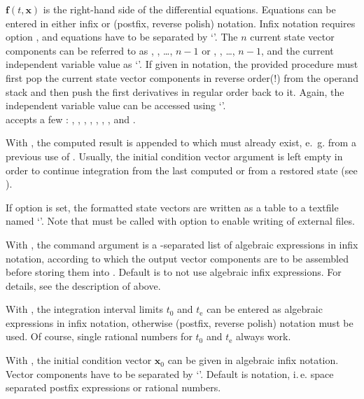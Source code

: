 \documentclass[11pt,english,BCOR10mm,DIV12,bibliography=totoc,parskip=false,smallheadings
    headexclude,footexclude,oneside,dvips]{pst-doc}
\begin{document}
$\mathbf{f}(t,\mathbf{x})$ is the right-hand side of the differential equations. Equations can be entered in either infix or \PS{} (postfix, reverse polish) notation. Infix notation requires option , and equations have to be separated by `\Lkeyword{|}'. The $n$ current state vector components can be referred to as , , \dots, \Lkeyword{x[}$n-1$\Lkeyword{]} or , , \dots, \Lkeyword{y[}$n-1$\Lkeyword{]}, and the current independent variable value as `'. If given in \PS{} notation, the provided procedure must first pop the current state vector components in reverse order(!) from the operand stack and then push the first derivatives in regular order back to it. Again, the independent variable value can be accessed using `'.\\[1ex]
 accepts a few \OptArgs: , , , , , , ,  and .

With , the computed result is appended to  which must already exist, e.\, g. from a previous use of . Usually, the initial condition vector argument is left empty in order to continue integration from the last computed or from a restored state (see ).

If option  is set, the formatted state vectors are written as a table to a textfile named `'. Note that  must be called with option  to enable writing of external files.

With , the command argument  is a \Lkeyword{|}-separated list of algebraic expressions in infix notation, according to which the output vector components are to be assembled before storing them into . Default is to not use algebraic infix expressions. For details, see the description of  above.

With , the integration interval limits $t_0$ and $t_\mathrm{e}$ can be entered as algebraic expressions in infix notation, otherwise \PS{} (postfix, reverse polish) notation must be used. Of course, single rational numbers for  $t_0$ and $t_\mathrm{e}$ always work.

With , the initial condition vector $\mathbf{x}_0$ can be given in algebraic infix notation. Vector components have to be separated by `\Lkeyword{|}'. Default is \PS{} notation, i.\,e. space separated postfix expressions or rational numbers.
\end{document}
